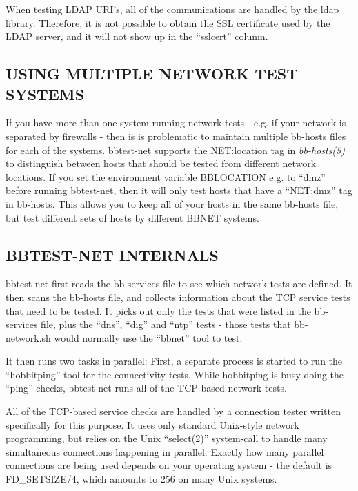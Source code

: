   When testing LDAP URI's, all of the communications are handled by
  the ldap library. Therefore, it is not possible to obtain the SSL
  certificate used by the LDAP server, and it will not show up in the
  ``sslcert'' column. 



 
\subsection{USING MULTIPLE NETWORK TEST SYSTEMS}
 If you have more than one system running network tests - e.g. if your
 network is separated by firewalls - then is is problematic to
 maintain multiple bb-hosts files for each of the systems. bbtest-net
 supports the NET:location tag in \emph{bb-hosts(5)} to distinguish
 between hosts that should be tested from different network
 locations. If you set the environment variable BBLOCATION e.g. to
 ``dmz'' before running bbtest-net, then it will only test hosts that
 have a ``NET:dmz'' tag in bb-hosts. This allows you to keep all of
 your hosts in the same bb-hosts file, but test different sets of
 hosts by different BBNET systems. 


 


 
\subsection{BBTEST-NET INTERNALS}
 bbtest-net first reads the bb-services file to see which network
 tests are defined. It then scans the bb-hosts file, and collects
 information about the TCP service tests that need to be tested. It
 picks out only the tests that were listed in the bb-services file,
 plus the ``dns'', ``dig'' and ``ntp'' tests - those tests that
 bb-network.sh would normally use the ``bbnet'' tool to test. 


  It then runs two tasks in parallel: First, a separate process is
  started to run the ``hobbitping'' tool for the connectivity
  tests. While hobbitping is busy doing the ``ping'' checks,
  bbtest-net runs all of the TCP-based network tests. 



  All of the TCP-based service checks are handled by a connection
  tester written specifically for this purpose. It uses only standard
  Unix-style network programming, but relies on the Unix ``select(2)''
  system-call to handle many simultaneous connections happening in
  parallel. Exactly how many parallel connections are being used
  depends on your operating system - the default is FD\_SETSIZE/4,
  which amounts to 256 on many Unix systems. 



